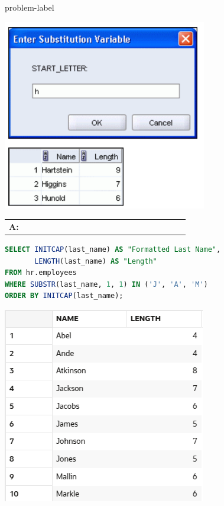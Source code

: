 \begin{problem}{}{problem-label}
\begin{center}
  \includegraphics[scale=0.8]{images/c3q5-3.png}
\end{center}

\begin{tabular}{@{}l p{0.9\linewidth}@{}}
  \textbf{A:} & 
\end{tabular}


\begin{lstlisting}[language=SQL]
SELECT INITCAP(last_name) AS "Formatted Last Name",
       LENGTH(last_name) AS "Length"
FROM hr.employees
WHERE SUBSTR(last_name, 1, 1) IN ('J', 'A', 'M')
ORDER BY INITCAP(last_name);

\end{lstlisting}

\vspace{1em}

\begin{center}
  \includegraphics[scale=0.8]{images/c3a5-1.png}
\end{center}


\end{problem}
